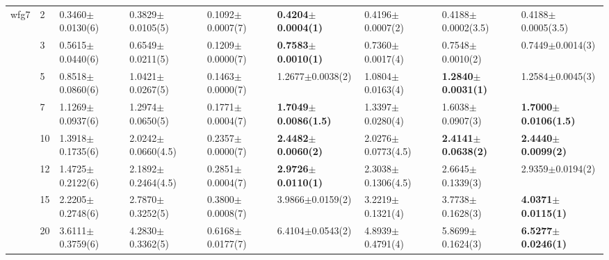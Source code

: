\begin{table*}[]
\begin{adjustbox}{width=1.0\textwidth,center}
\begin{tabular}{lllllllll}
wfg7  & 2                              & 0.3460$\pm$0.0130(6)         & 0.3829$\pm$0.0105(5)          & 0.1092$\pm$0.0007(7)              & \textbf{0.4204$\pm$0.0004(1)}                     & 0.4196$\pm$0.0007(2)                     & 0.4188$\pm$0.0002(3.5)                     & 0.4188$\pm$0.0005(3.5)          \\
      & 3                              & 0.5615$\pm$0.0440(6)         & 0.6549$\pm$0.0211(5)          & 0.1209$\pm$0.0000(7)              & \textbf{0.7583$\pm$0.0010(1)}                     & 0.7360$\pm$0.0017(4)                     & 0.7548$\pm$0.0010(2)                       & 0.7449$\pm$0.0014(3)            \\
      & 5                              & 0.8518$\pm$0.0860(6)         & 1.0421$\pm$0.0267(5)          & 0.1463$\pm$0.0000(7)              & 1.2677$\pm$0.0038(2)                              & 1.0804$\pm$0.0163(4)                     & \textbf{1.2840$\pm$0.0031(1)}              & 1.2584$\pm$0.0045(3)            \\
      & 7                              & 1.1269$\pm$0.0937(6)         & 1.2974$\pm$0.0650(5)          & 0.1771$\pm$0.0004(7)              & \textbf{1.7049$\pm$0.0086(1.5)}                   & 1.3397$\pm$0.0280(4)                     & 1.6038$\pm$0.0907(3)                       & \textbf{1.7000$\pm$0.0106(1.5)} \\
      & 10                             & 1.3918$\pm$0.1735(6)         & 2.0242$\pm$0.0660(4.5)        & 0.2357$\pm$0.0000(7)              & \textbf{2.4482$\pm$0.0060(2)}                     & 2.0276$\pm$0.0773(4.5)                   & \textbf{2.4141$\pm$0.0638(2)}              & \textbf{2.4440$\pm$0.0099(2)}   \\
      & 12                             & 1.4725$\pm$0.2122(6)         & 2.1892$\pm$0.2464(4.5)        & 0.2851$\pm$0.0004(7)              & \textbf{2.9726$\pm$0.0110(1)}                     & 2.3038$\pm$0.1306(4.5)                   & 2.6645$\pm$0.1339(3)                       & 2.9359$\pm$0.0194(2)            \\
      & 15                             & 2.2205$\pm$0.2748(6)         & 2.7870$\pm$0.3252(5)          & 0.3800$\pm$0.0008(7)              & 3.9866$\pm$0.0159(2)                              & 3.2219$\pm$0.1321(4)                     & 3.7738$\pm$0.1628(3)                       & \textbf{4.0371$\pm$0.0115(1)}   \\
      & 20                             & 3.6111$\pm$0.3759(6)         & 4.2830$\pm$0.3362(5)          & 0.6168$\pm$0.0177(7)              & 6.4104$\pm$0.0543(2)                              & 4.8939$\pm$0.4791(4)                     & 5.8699$\pm$0.1624(3)                       & \textbf{6.5277$\pm$0.0246(1)}   \\

\end{tabular}
\end{adjustbox}
\end{table*}
